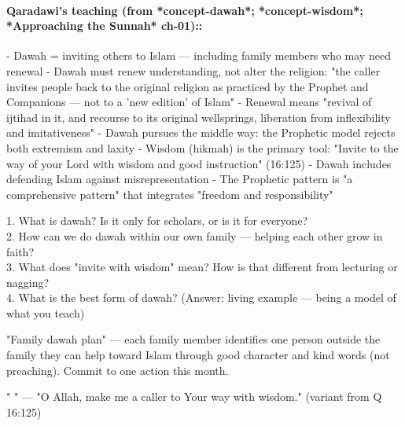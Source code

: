 \documentclass[11pt,a4paper]{article}
\begin{document}
\paragraph*{Qaradawi's teaching (from *concept-dawah*; *concept-wisdom*; *Approaching the Sunnah* ch-01)::}  - Dawah = inviting others to Islam --- including family members who may need renewal - Dawah must renew understanding, not alter the religion: "the caller invites people back to the original religion as practiced by the Prophet and Companions --- not to a 'new edition' of Islam" - Renewal means "revival of ijtihad in it, and recourse to its original wellsprings, liberation from inflexibility and imitativeness" - Dawah pursues the middle way: the Prophetic model rejects both extremism and laxity - Wisdom (hikmah) is the primary tool: "Invite to the way of your Lord with wisdom and good instruction" (16:125) - Dawah includes defending Islam against misrepresentation - The Prophetic pattern is "a comprehensive pattern" that integrates "freedom and responsibility"

\begin{discussionbox} 1. What is dawah? Is it only for scholars, or is it for everyone? \\ 2. How can we do dawah within our own family --- helping each other grow in faith? \\ 3. What does "invite with wisdom" mean? How is that different from lecturing or nagging? \\ 4. What is the best form of dawah? (Answer: living example --- being a model of what you teach) \end{discussionbox}

\begin{activitybox} "Family dawah plan" --- each family member identifies one person outside the family they can help toward Islam through good character and kind words (not preaching). Commit to one action this month. \end{activitybox}

\begin{duabox} "     " --- "O Allah, make me a caller to Your way with wisdom." (variant from Q 16:125) \end{duabox}

\vspace{6pt}\noindent{\color{border}\rule{\textwidth}{0.5pt}}\vspace{6pt}
\end{document}
